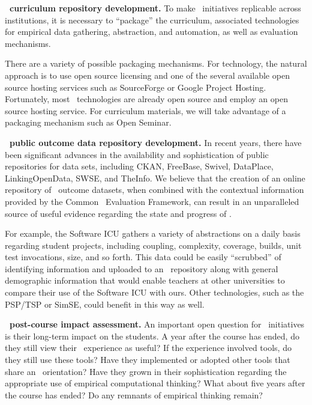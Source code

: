 {\bf \eCT\ curriculum repository development.}  To make \eCT\ initiatives
replicable across institutions, it is necessary to ``package'' the
curriculum, associated technologies for empirical data gathering,
abstraction, and automation, as well as evaluation mechanisms.  

There are a variety of possible packaging mechanisms.  For technology, the 
natural approach is to use open source licensing and one of the several
available open source hosting services such as SourceForge or Google Project
Hosting.  Fortunately, most \eCT\ technologies are already open source and
employ an open source hosting service.  For curriculum materials, we will 
take advantage of a packaging mechanism such as Open Seminar. 

{\bf \eCT\ public outcome data repository development.}  In recent years,
there have been significant advances in the availability and sophistication
of public repositories for data sets, including CKAN, FreeBase, Swivel,
DataPlace, LinkingOpenData, SWSE, and TheInfo.  We believe that the
creation of an online repository of \eCT\ outcome datasets, when combined
with the contextual information provided by the Common \eCT\ Evaluation
Framework, can result in an unparalleled source of useful evidence
regarding the state and progress of \eCT.  

For example, the Software ICU gathers a variety of abstractions on a daily
basis regarding student projects, including coupling, complexity, coverage,
builds, unit test invocations, size, and so forth.  This data could be
easily ``scrubbed'' of identifying information and uploaded to an \eCT\
repository along with general demographic information that would enable
teachers at other universities to compare their use of the Software ICU
with ours.  Other technologies, such as the PSP/TSP or SimSE, could benefit
in this way as well.

{\bf \eCT\ post-course impact assessment.}  An important open question for
\eCT\ initiatives is their long-term impact on the students.  A year after
the course has ended, do they still view their \eCT\ experience as useful?
If the experience involved tools, do they still use these tools?  Have they
implemented or adopted other tools that share an \eCT\ orientation?  Have
they grown in their sophistication regarding the appropriate use of
empirical computational thinking? What about five years after the course
has ended?  Do any remnants of empirical thinking remain?

